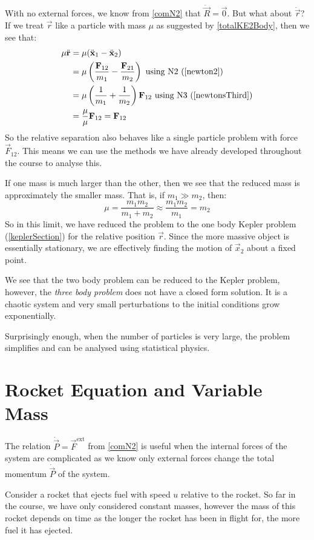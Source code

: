 \documentclass[../main.tex]{subfiles}
\begin{document}
With no external forces, we know from \cref{comN2} that $\ddot{\vec{R}} = \vec{0}$.
But what about $\ddot{\vec{r}}$?
If we treat $\vec{r}$ like a particle with mass $\mu$ as suggested by \cref{totalKE2Body}, then we see that:
\begin{align*}
  \mu \ddot{\vec{r}} &= \mu (\ddot{\vec{x}}_1 - \ddot{\vec{x}}_2) \\
                     &= \mu \left(\frac{\vec{F}_{1 2}}{m_1} - \frac{\vec{F}_{2 1}}{m_2}\right) \text{ using N2 (\cref{newton2})}\\
                     &= \mu \left(\frac{1}{m_1} + \frac{1}{m_2}\right)\vec{F}_{1 2} \text{ using N3 (\cref{newtonsThird})}\\
                     &= \frac{\mu}{\mu}\vec{F}_{1 2} = \vec{F}_{1 2}
\end{align*}
So the relative separation also behaves like a single particle problem with force $\vec{F}_{1 2}$.
This means we can use the methods we have already developed throughout the course to analyse this.

If one mass is much larger than the other, then we see that the reduced mass is approximately the smaller mass.
That is, if $m_1 \gg m_2$, then:
\[
  \mu = \frac{m_1 m_2}{m_1 + m_2} \approx \frac{m_1m_2}{m_1} = m_2
\]
So in this limit, we have reduced the problem to the one body Kepler problem (\cref{keplerSection}) for the relative position $\vec{r}$.
Since the more massive object is essentially stationary, we are effectively finding the motion of $\vec{x}_2$ about a fixed point.
\begin{remark}
  We see that the two body problem can be reduced to the Kepler problem, however, the \textit{three body problem} does not have a closed form solution.
  It is a chaotic system and very small perturbations to the initial conditions grow exponentially.

  Surprisingly enough, when the number of particles is very large, the problem simplifies and can be analysed using statistical physics.
\end{remark}
\section{Rocket Equation and Variable Mass}
The relation $\dot{\vec{P}} = \vec{F}^{\text{ext}}$ from \cref{comN2} is useful when the internal forces of the system are complicated as we know only external forces change the total momentum $\dot{\vec{P}}$ of the system.

Consider a rocket that ejects fuel with speed $u$ relative to the rocket.
So far in the course, we have only considered constant masses, however the mass of this rocket depends on time as the longer the rocket has been in flight for, the more fuel it has ejected.
\end{document}
